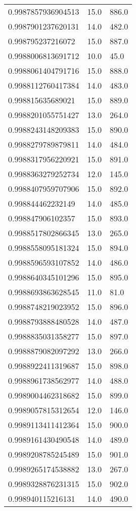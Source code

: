 \begin{center}
\begin{supertabular}[H]{p{0.30\textwidth}p{0.05\textwidth}p{0.05\textwidth}}
0.9987857936904513 & 15.0 & 886.0 \\ 
0.9987901237620131 & 14.0 & 482.0 \\ 
0.998795237216072 & 15.0 & 887.0 \\ 
0.9988006813691712 & 10.0 & 45.0 \\ 
0.9988061404791716 & 15.0 & 888.0 \\ 
0.9988112760417384 & 14.0 & 483.0 \\ 
0.998815635689021 & 15.0 & 889.0 \\ 
0.9988201055751427 & 13.0 & 264.0 \\ 
0.9988243148209383 & 15.0 & 890.0 \\ 
0.9988279789879811 & 14.0 & 484.0 \\ 
0.9988317956220921 & 15.0 & 891.0 \\ 
0.9988363279252734 & 12.0 & 145.0 \\ 
0.9988407959707906 & 15.0 & 892.0 \\ 
0.998844462232149 & 14.0 & 485.0 \\ 
0.998847906102357 & 15.0 & 893.0 \\ 
0.9988517802866345 & 13.0 & 265.0 \\ 
0.9988558095181324 & 15.0 & 894.0 \\ 
0.9988596593107852 & 14.0 & 486.0 \\ 
0.9988640345101296 & 15.0 & 895.0 \\ 
0.9988693863628545 & 11.0 & 81.0 \\ 
0.9988748219023952 & 15.0 & 896.0 \\ 
0.9988793888480528 & 14.0 & 487.0 \\ 
0.9988835031358277 & 15.0 & 897.0 \\ 
0.9988879082097292 & 13.0 & 266.0 \\ 
0.9988922411319687 & 15.0 & 898.0 \\ 
0.9988961738562977 & 14.0 & 488.0 \\ 
0.9989004462318682 & 15.0 & 899.0 \\ 
0.9989057815312654 & 12.0 & 146.0 \\ 
0.9989113411412364 & 15.0 & 900.0 \\ 
0.9989161430490548 & 14.0 & 489.0 \\ 
0.9989208785245489 & 15.0 & 901.0 \\ 
0.9989265174538882 & 13.0 & 267.0 \\ 
0.9989328876231315 & 15.0 & 902.0 \\ 
0.998940115216131 & 14.0 & 490.0 \\ 

\end{supertabular}
\end{center}
